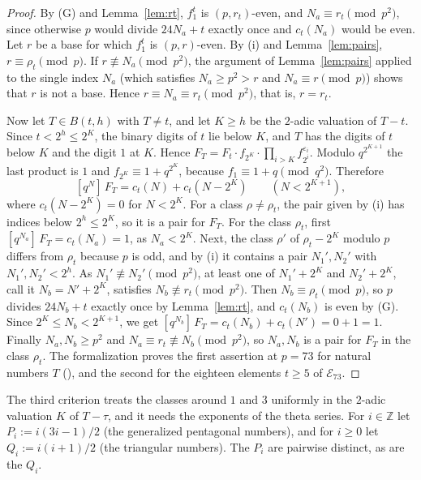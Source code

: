 \documentclass[12pt]{amsart}
\theoremstyle{definition}
\newcommand{\Z}{\mathbb{Z}}
\newcommand{\cE}{\mathcal{E}}
\newcommand{\B}{B}
\newcommand{\coef}[2]{[q^{#1}]\,#2}
\begin{document}
\begin{proof}
By (G) and Lemma~\ref{lem:rt}, $f_1^t$ is $(p,r_t)$-even, and $N_a\equiv r_t\pmod{p^2}$, since otherwise $p$ would divide $24N_a+t$ exactly once and $c_t(N_a)$ would be even. Let $r$ be a base for which $f_1^t$ is $(p,r)$-even. By (i) and Lemma~\ref{lem:pairs}, $r\equiv\rho_t\pmod p$. If $r\not\equiv N_a\pmod{p^2}$, the argument of Lemma~\ref{lem:pairs} applied to the single index $N_a$ (which satisfies $N_a\ge p^2>r$ and $N_a\equiv r\pmod p$) shows that $r$ is not a base. Hence $r\equiv N_a\equiv r_t\pmod{p^2}$, that is, $r=r_t$.

Now let $T\in\B(t,h)$ with $T\ne t$, and let $K\ge h$ be the $2$-adic valuation of $T-t$. Since $t<2^h\le2^K$, the binary digits of $t$ lie below $K$, and $T$ has the digits of $t$ below $K$ and the digit $1$ at $K$. Hence $F_T=F_t\cdot f_{2^K}\cdot\prod_{i>K}f_{2^i}^{\varepsilon_i}$. Modulo $q^{2^{K+1}}$ the last product is $1$ and $f_{2^K}\equiv1+q^{2^K}$, because $f_1\equiv1+q\pmod{q^2}$. Therefore
\[
\coef{N}{F_T}=c_t(N)+c_t(N-2^K)\qquad(N<2^{K+1}),
\]
where $c_t(N-2^K)=0$ for $N<2^K$. For a class $\rho\ne\rho_t$, the pair given by (i) has indices below $2^h\le2^K$, so it is a pair for $F_T$. For the class $\rho_t$, first $\coef{N_a}{F_T}=c_t(N_a)=1$, as $N_a<2^K$. Next, the class $\rho'$ of $\rho_t-2^K$ modulo $p$ differs from $\rho_t$ because $p$ is odd, and by (i) it contains a pair $N_1',N_2'$ with $N_1',N_2'<2^h$. As $N_1'\not\equiv N_2'\pmod{p^2}$, at least one of $N_1'+2^K$ and $N_2'+2^K$, call it $N_b=N'+2^K$, satisfies $N_b\not\equiv r_t\pmod{p^2}$. Then $N_b\equiv\rho_t\pmod p$, so $p$ divides $24N_b+t$ exactly once by Lemma~\ref{lem:rt}, and $c_t(N_b)$ is even by (G). Since $2^K\le N_b<2^{K+1}$, we get $\coef{N_b}{F_T}=c_t(N_b)+c_t(N')=0+1=1$. Finally $N_a,N_b\ge p^2$ and $N_a\equiv r_t\not\equiv N_b\pmod{p^2}$, so $N_a,N_b$ is a pair for $F_T$ in the class $\rho_t$. The formalization proves the first assertion at $p=73$ for natural numbers $T$ (), and the second for the eighteen elements $t\ge5$ of $\cE_{73}$.
\end{proof}

The third criterion treats the classes around $1$ and $3$ uniformly in the $2$-adic valuation $K$ of $T-\tau$, and it needs the exponents of the theta series. For $i\in\Z$ let $P_i:=i(3i-1)/2$ (the generalized pentagonal numbers), and for $i\ge0$ let $Q_i:=i(i+1)/2$ (the triangular numbers). The $P_i$ are pairwise distinct, as are the $Q_i$.
\end{document}
